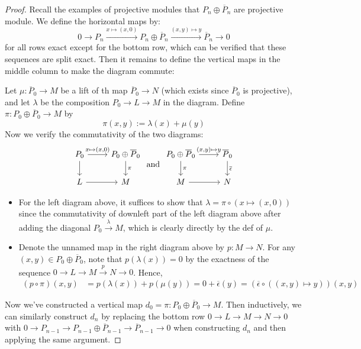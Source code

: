 \begin{proof}
    Recall the examples of projective modules that $P_n \oplus \overline{P}_n$ are projective module. We define the horizontal maps by:
    \[
    0\to P_n \xrightarrow{x \mapsto (x,0)} P_n\oplus \overline{P}_n \xrightarrow{(x,y) \mapsto y} \overline{P}_n \to0
    \]
    for all rows exact except for the bottom row, which can be verified that these sequences are split exact. Then it remains to define the vertical maps in the middle column to make the diagram commute:

    Let $\mu:\overline{P}_0 \to M$ be a lift of th map $\overline{P}_0 \to N$ (which exists since $\overline{P}_0$ is projective), and let $\lambda$ be the composition $P_0\to L \to M$ in the diagram. Define $\pi: P_0\oplus \overline{P}_0 \to M$ by
    \[
    \pi(x,y) := \lambda(x) +\mu(y)
    \]
    Now we verify the commutativity of the two diagrams:
    \[
    \begin{tikzcd}
        P_0 \arrow[r, "x \mapsto (x\text{,}0)"] \arrow[d] &P_0 \oplus \overline{P}_0 \arrow[d, "\pi"]\\
        L \arrow[r] &M
    \end{tikzcd}
    \text{  and  }
    \begin{tikzcd}
        P_0 \oplus \overline{P}_0 \arrow[r, "(x\text{,}y) \mapsto y"] \arrow[d, "\pi"] &\overline{P}_0 \arrow[d, "\overline{\epsilon}"]\\
        M \arrow[r]& N
    \end{tikzcd}
    \]
    \begin{itemize}
        \item For the left diagram above, it suffices to show that $\lambda= \pi \circ (x\mapsto (x,0))$ since the commutativity of downleft part of the left diagram above after adding the diagonal $P_0 \xrightarrow{\lambda} M$, which is clearly directly by the def of $\mu$.

        \item Denote the unnamed map in the right diagram above by $p:M\to N$. For any $(x,y) \in P_0 \oplus \overline{P}_0$, note that $p(\lambda(x))=0$ by the exactness of the sequence $0 \to L\to M\xrightarrow{p}N \to0$. Hence,
        \begin{align*}
            (p\circ \pi) (x,y) &= p(\lambda(x)) +p(\mu(y))=0+\overline{\epsilon} (y)= (\overline{\epsilon} \circ ((x,y) \mapsto y)) (x,y)
        \end{align*}
    \end{itemize}
    Now we've constructed a vertical map $d_0=\pi: P_0 \oplus \overline{P}_0 \to M$. Then inductively, we can similarly construct $d_n$ by replacing the bottom row $0\to L\to M \to N \to 0$ with $0\to P_{n-1} \to P_{n-1} \oplus \overline{P}_{n-1} \to \overline{P}_{n-1} \to0$ when constructing $d_n$ and then applying the same argument.
\end{proof}

